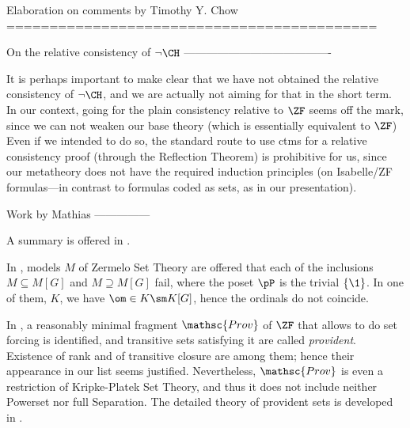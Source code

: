 Elaboration on comments by Timothy Y. Chow
===========================================

On the relative consistency of $\neg\CH$
----------------------------------------

It is perhaps important to make clear that we have not obtained the
relative consistency of $\neg\CH$, and we are
actually not aiming for that in the short term. In our context, going
for the plain consistency relative to $\ZF$ seems off the mark, since we
can not weaken our base theory (which is essentially equivalent to $\ZF$)%
Even if we intended to do so, the standard route to use ctms for a
relative consistency proof (through the Reflection Theorem) is
prohibitive for us, since our metatheory does not have the required
induction principles (on Isabelle/ZF formulas---in contrast to
formulas coded as sets, as in our presentation).


Work by Mathias
---------------

A summary is offered in \cite[Sect.~6]{kanamori-mathias}.


In \cite[Sect.~1]{mathias:hal-01188043}, models $M$ of Zermelo Set
Theory are offered that each of the inclusions $M\subseteq M[G]$ and
$M\supseteq M[G]$ fail, where the poset $\pP$ is the trivial
$\{\1 \}$. In one of them, $K$, we have $\om\in K \sm K[G]$, hence the
ordinals do not coincide.


In \cite{mathias-provident}, a reasonably minimal fragment
$\mathsc{Prov}$ of $\ZF$ that allows to do set forcing is identified,
and transitive sets satisfying it are called
\emph{provident}. Existence of rank and of transitive closure are
among them; hence their appearance in our list seems
justified. Nevertheless, $\mathsc{Prov}$ is even a restriction of
Kripke-Platek Set Theory, and thus it does not include neither
Powerset nor full Separation. The detailed theory of provident sets is
developed in \cite{mathias-bowler-gentle}. %



